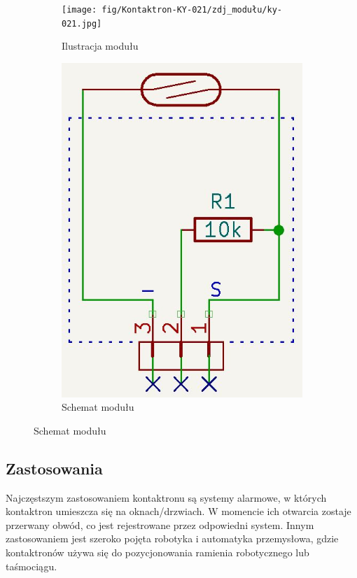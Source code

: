 \documentclass[11pt, a4paper]{article}
\begin{document}
\vspace{0.2cm}
\begin{figure}[h]
\centering
\begin{subfigure}{.5\textwidth}
  \centering
  \texttt{[image: fig/Kontaktron-KY-021/zdj\_modułu/ky-021.jpg]}
  \caption{Ilustracja modułu \cite{KY_021_example_photo}}
  \label{fig:sub1}
\end{subfigure}%
\begin{subfigure}{.5\textwidth}
  \centering
  \includegraphics[width=.65\linewidth]{fig/Kontaktron-KY-021/polaczenie_modulu/schemat_ky_021.png}
  \caption{Schemat modułu}
  \label{fig:sub2}
\end{subfigure}
\label{fig:test}
\end{figure}
\vspace{0.2cm}

\subsection{Zastosowania}
Najczęstszym zastosowaniem kontaktronu są systemy alarmowe, w których kontaktron umieszcza się na oknach/drzwiach. W momencie ich otwarcia zostaje przerwany obwód, co jest rejestrowane przez odpowiedni system. Innym zastosowaniem jest szeroko pojęta robotyka i automatyka przemysłowa, gdzie kontaktronów używa się do pozycjonowania ramienia robotycznego lub taśmociągu.


\newpage
\end{document}
